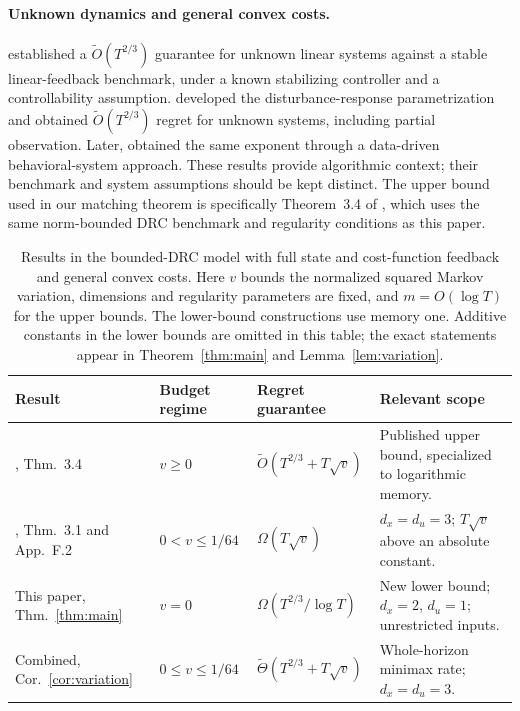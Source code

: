 \documentclass[11pt]{article}
\theoremstyle{remark}
\begin{document}
\paragraph{Unknown dynamics and general convex costs.}
\citet{hazan} established a $\widetilde O(T^{2/3})$ guarantee for unknown
linear systems against a stable linear-feedback benchmark, under a known
stabilizing controller and a controllability assumption.
\citet{improper} developed the disturbance-response parametrization and
obtained $\widetilde O(T^{2/3})$ regret for unknown systems, including
partial observation. Later, \citet{liuchen} obtained the same exponent
through a data-driven behavioral-system approach. These results provide
algorithmic context; their benchmark and system assumptions should be kept
distinct. The upper bound used in our matching theorem is specifically
Theorem~3.4 of \citet{minasyan}, which uses the same norm-bounded DRC
benchmark and regularity conditions as this paper.

\begin{table}[t]
\centering
\small
\setlength{\tabcolsep}{4.5pt}
\renewcommand{\arraystretch}{1.16}
\caption{Results in the bounded-DRC model with full state and cost-function
feedback and general convex costs. Here $v$ bounds the normalized squared
Markov variation, dimensions and regularity parameters are fixed, and
$m=O(\log T)$ for the upper bounds. The lower-bound constructions use
memory one. Additive constants in the lower bounds are omitted in this
table; the exact statements appear in Theorem~\ref{thm:main} and
Lemma~\ref{lem:variation}.}
\label{tab:comparison}
\begin{tabularx}{\textwidth}{@{}P{0.24\textwidth}P{0.15\textwidth}P{0.25\textwidth}Y@{}}
\toprule
Result & Budget regime & Regret guarantee & Relevant scope\\
\midrule
\citet{minasyan}, Thm.~3.4
& $v\ge0$
& $\widetilde O(T^{2/3}+T\sqrt v)$
& Published upper bound, specialized to logarithmic memory.\\[3pt]
\citet{minasyan}, Thm.~3.1 and App.~F.2
& $0<v\le1/64$
& $\Omega(T\sqrt v)$
& $d_x=d_u=3$; $T\sqrt v$ above an absolute constant.\\[3pt]
This paper, Thm.~\ref{thm:main}
& $v=0$
& $\Omega(T^{2/3}/\log T)$
& New lower bound; $d_x=2$, $d_u=1$; unrestricted inputs.\\[3pt]
Combined, Cor.~\ref{cor:variation}
& $0\le v\le1/64$
& $\widetilde\Theta(T^{2/3}+T\sqrt v)$
& Whole-horizon minimax rate; $d_x=d_u=3$.\\
\bottomrule
\end{tabularx}
\end{table}
\end{document}
